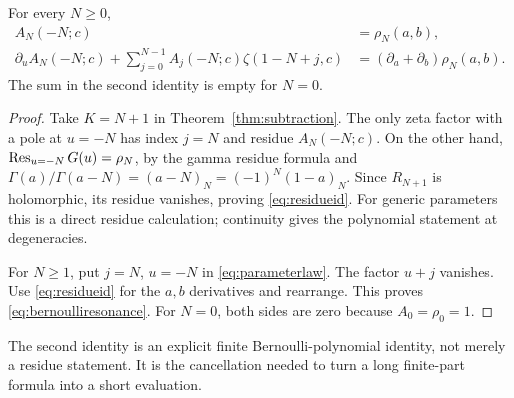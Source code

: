 \begin{proposition}\label{prop:rho}
For every $N\ge0$,
\begin{align}
 A_N(-N;c)&=\rho_N(a,b),\label{eq:residueid}\\
 \partial_u A_N(-N;c)
 +\sum_{j=0}^{N-1}A_j(-N;c)\zeta(1-N+j,c)
 &=(\partial_a+\partial_b)\rho_N(a,b).
 \label{eq:bernoulliresonance}
\end{align}
The sum in the second identity is empty for $N=0$.
\end{proposition}
\begin{proof}
Take $K=N+1$ in Theorem~\ref{thm:subtraction}.
The only zeta factor with a pole at $u=-N$ has index $j=N$ and residue
$A_N(-N;c)$.  On the other hand,
$\operatorname{Res}_{u=-N}G(u)=\rho_N$, by the gamma residue formula and
$\Gamma(a)/\Gamma(a-N)=(a-N)_N=(-1)^N(1-a)_N$.
Since $R_{N+1}$ is holomorphic, its residue vanishes, proving
\eqref{eq:residueid}.  For generic parameters this is a direct residue
calculation; continuity gives the polynomial statement at degeneracies.

For $N\ge1$, put $j=N$, $u=-N$ in \eqref{eq:parameterlaw}.
The factor $u+j$ vanishes.  Use \eqref{eq:residueid} for the
$a,b$ derivatives and rearrange.  This proves
\eqref{eq:bernoulliresonance}.  For $N=0$, both sides are zero because
$A_0=\rho_0=1$.
\end{proof}

The second identity is an explicit finite Bernoulli-polynomial identity,
not merely a residue statement.  It is the cancellation needed to turn a
long finite-part formula into a short evaluation.


